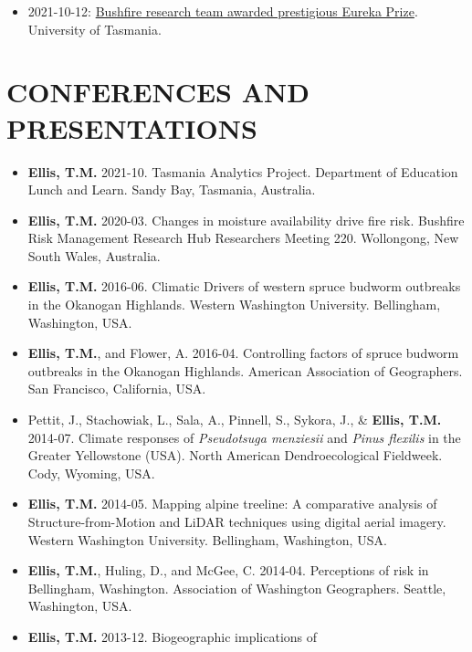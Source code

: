 \documentclass[11pt,a4paper,]{awesome-cv}
\providecommand{\tightlist}{%
	\setlength{\itemsep}{0pt}\setlength{\parskip}{0pt}}
\begin{document}
\begin{itemize}
\tightlist
\item
  2021-10-12:
  \href{https://www.utas.edu.au/communications/general-news/all-news/bushfire-research-team-awarded-prestigious-eureka-prize}{Bushfire
  research team awarded prestigious Eureka Prize}. University of
  Tasmania.
\end{itemize}

\hypertarget{conferences-and-presentations}{%
\section{CONFERENCES AND
PRESENTATIONS}\label{conferences-and-presentations}}

\begin{itemize}
\tightlist
\item
  \textbf{Ellis, T.M.} 2021-10. Tasmania Analytics Project. Department
  of Education Lunch and Learn. Sandy Bay, Tasmania, Australia.
\item
  \textbf{Ellis, T.M.} 2020-03. Changes in moisture availability drive
  fire risk. Bushfire Risk Management Research Hub Researchers Meeting
  220. Wollongong, New South Wales, Australia.
\item
  \textbf{Ellis, T.M.} 2016-06. Climatic Drivers of western spruce
  budworm outbreaks in the Okanogan Highlands. Western Washington
  University. Bellingham, Washington, USA.
\item
  \textbf{Ellis, T.M.}, and Flower, A. 2016-04. Controlling factors of
  spruce budworm outbreaks in the Okanogan Highlands. American
  Association of Geographers. San Francisco, California, USA.
\item
  Pettit, J., Stachowiak, L., Sala, A., Pinnell, S., Sykora, J., \&
  \textbf{Ellis, T.M.} 2014-07. Climate responses of \emph{Pseudotsuga
  menziesii} and \emph{Pinus flexilis} in the Greater Yellowstone (USA).
  North American Dendroecological Fieldweek. Cody, Wyoming, USA.
\item
  \textbf{Ellis, T.M.} 2014-05. Mapping alpine treeline: A comparative
  analysis of Structure-from-Motion and LiDAR techniques using digital
  aerial imagery. Western Washington University. Bellingham, Washington,
  USA.
\item
  \textbf{Ellis, T.M.}, Huling, D., and McGee, C. 2014-04. Perceptions
  of risk in Bellingham, Washington. Association of Washington
  Geographers. Seattle, Washington, USA.
\item
  \textbf{Ellis, T.M.} 2013-12. Biogeographic implications of

\end{itemize}
\end{document}
